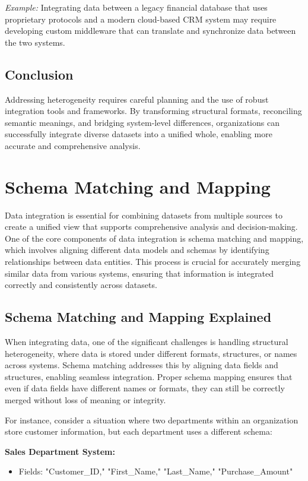 \documentclass[12pt]{article}
\begin{document}
\textit{Example:} Integrating data between a legacy financial database that uses proprietary protocols and a modern cloud-based CRM system may require developing custom middleware that can translate and synchronize data between the two systems.

\subsection{Conclusion}
Addressing heterogeneity requires careful planning and the use of robust integration tools and frameworks. By transforming structural formats, reconciling semantic meanings, and bridging system-level differences, organizations can successfully integrate diverse datasets into a unified whole, enabling more accurate and comprehensive analysis.

\section{Schema Matching and Mapping}
Data integration is essential for combining datasets from multiple sources to create a unified view that supports comprehensive analysis and decision-making. One of the core components of data integration is schema matching and mapping, which involves aligning different data models and schemas by identifying relationships between data entities. This process is crucial for accurately merging similar data from various systems, ensuring that information is integrated correctly and consistently across datasets.

\subsection{Schema Matching and Mapping Explained}
When integrating data, one of the significant challenges is handling structural heterogeneity, where data is stored under different formats, structures, or names across systems. Schema matching addresses this by aligning data fields and structures, enabling seamless integration. Proper schema mapping ensures that even if data fields have different names or formats, they can still be correctly merged without loss of meaning or integrity.

For instance, consider a situation where two departments within an organization store customer information, but each department uses a different schema:

\textbf{Sales Department System:}
\begin{itemize}
    \item Fields: "Customer\_ID," "First\_Name," "Last\_Name," "Purchase\_Amount"
\end{itemize}
\end{document}
